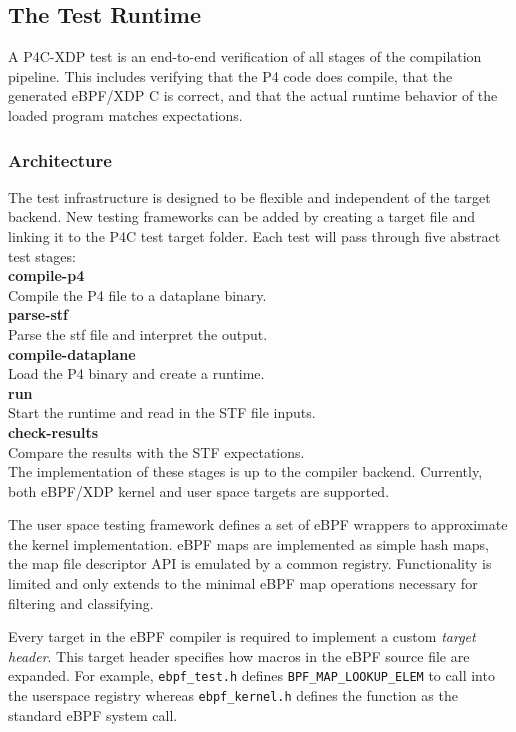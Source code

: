 \subsection{The Test Runtime}
A P4C-XDP test is an end-to-end verification of all stages of 
the compilation pipeline. This includes verifying that the P4 code does 
compile, that the generated eBPF/XDP C is correct, and that the actual runtime 
behavior of the loaded program matches expectations.

\subsubsection{Architecture}
The test infrastructure is designed to be flexible and independent of the 
target backend. New testing frameworks can be added by creating a target file 
and linking it to the P4C test target folder. Each test will pass through five 
abstract test stages:\\

\noindent\textbf{compile-p4}\\ Compile the P4 file to a dataplane binary. \\
\textbf{parse-stf}\\ Parse the stf file and interpret the output. \\
\textbf{compile-dataplane}\\ Load the P4 binary and create a runtime.\\
\textbf{run}\\ Start the runtime and read in the STF file inputs.\\
\textbf{check-results}\\ Compare the results with the STF 
expectations.\\

The implementation of these stages is up to the compiler backend.
Currently, both eBPF/XDP kernel and user space targets are supported.

The user space testing framework defines a set of eBPF wrappers to approximate 
the kernel implementation. eBPF maps are implemented as simple hash maps, the 
map file descriptor API is emulated by a common registry. Functionality is 
limited and only extends to the minimal eBPF map operations necessary for 
filtering and classifying.

Every target in the eBPF compiler is required to implement a custom 
\textit{target header}. This target header specifies how macros in the eBPF 
source file are expanded. For example, \texttt{ebpf\_test.h} defines 
\texttt{BPF\_MAP\_LOOKUP\_ELEM} to call into the userspace registry whereas 
\texttt{ebpf\_kernel.h} defines the function as the standard eBPF system call.

